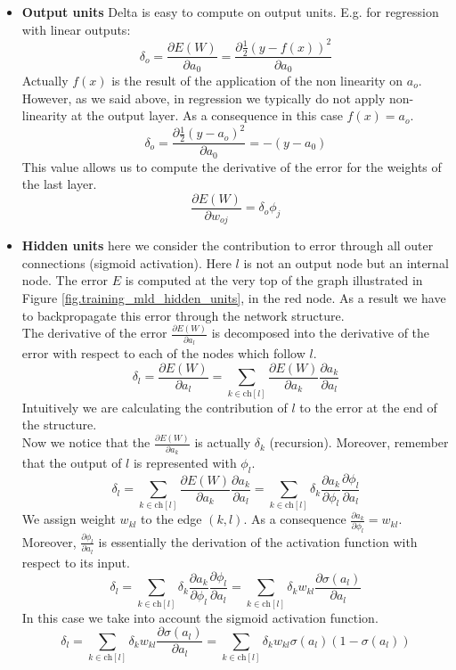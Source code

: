 \begin{itemize}
	\item \textbf{Output units} Delta is easy to compute on output units. E.g. for
		regression with linear outputs:
		\[
			\delta_{o}= \frac{\partial E(W)}{\partial a_{0}}= \frac{\partial
			\frac{1}{2}(y-f(x))^{2}}{\partial a_{0}}
		\]
		Actually $f(x)$ is the result of the application of the non linearity on $a_{o}$.
		However, as we said above, in regression we typically do not apply non-linearity
		at the output layer. As a consequence in this case $f(x)=a_{o}$.
		\[
			\delta_{o}= \frac{\partial \frac{1}{2}(y-a_{o})^{2}}{\partial a_{0}}= -(y-
			a_{0})
		\]
		This value allows us to compute the derivative of the error for the weights
		of the last layer.
		\[
			\frac{\partial E(W)}{\partial w_{oj}}= \delta_{o}\phi_{j}
		\]

	\item \textbf{Hidden units} here we consider the contribution to error through
		all outer connections (sigmoid activation). Here $l$ is not an output node but
		an internal node. The error $E$ is computed at the very top of the graph
		illustrated in Figure \ref{fig.training_mld_hidden_units}, in the red node.
		As a result we have to backpropagate this error through the network
		structure.\\ The derivative of the error
		$\frac{\partial E(W)}{\partial a_{l}}$ is decomposed into the derivative of
		the error with respect to each of the nodes which follow $l$.
		\[
			\delta_{l}= \frac{\partial E(W)}{\partial a_{l}}= \sum_{k \in \text{ch}[l]}
			\frac{\partial E(W)}{\partial a_{k}}\frac{\partial a_{k}}{\partial a_{l}}
		\]
		Intuitively we are calculating the contribution of $l$ to the error at the end
		of the structure.\\ Now we notice that the $\frac{\partial E(W)}{\partial a_{k}}$
		is actually $\delta_{k}$ (recursion). Moreover, remember that the output of $l$
		is represented with $\phi_{l}$.
		\[
			\delta_{l}= \sum_{k \in \text{ch}[l]}\frac{\partial E(W)}{\partial a_{k}}\frac{\partial
			a_{k}}{\partial a_{l}}= \sum_{k \in \text{ch}[l]}\delta_{k}\frac{\partial
			a_{k}}{\partial \phi_{l}}\frac{\partial \phi_{l}}{\partial a_{l}}
		\]
		We assign weight $w_{kl}$ to the edge $(k,l)$. As a consequence $\frac{\partial
		a_{k}}{\partial \phi_{l}}= w_{kl}$. Moreover, $\frac{\partial \phi_{l}}{\partial
		a_{l}}$ is essentially the derivation of the activation function with respect
		to its input.
		\[
			\delta_{l}= \sum_{k \in \text{ch}[l]}\delta_{k}\frac{\partial a_{k}}{\partial
			\phi_{l}}\frac{\partial \phi_{l}}{\partial a_{l}}= \sum_{k \in \text{ch}[l]}
			\delta_{k}w_{kl}\frac{\partial \sigma(a_{l})}{\partial a_{l}}
		\]
		In this case we take into account the sigmoid activation function.
		\[
			\delta_{l}= \sum_{k \in \text{ch}[l]}\delta_{k}w_{kl}\frac{\partial \sigma(a_{l})}{\partial
			a_{l}}= \sum_{k \in \text{ch}[l]}\delta_{k}w_{kl}\sigma (a_{l}) (1 - \sigma
			(a_{l}))
		\]
\end{itemize}

